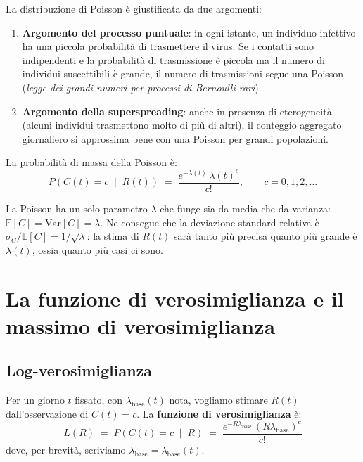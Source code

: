 \documentclass[12pt,a4paper]{article}
\newcommand{\lbase}{\lambda_{\mathrm{base}}}
\begin{document}
La distribuzione di Poisson è giustificata da due argomenti:

\begin{enumerate}
  \item \textbf{Argomento del processo puntuale}: in ogni istante, un individuo infettivo
        ha una piccola probabilità di trasmettere il virus. Se i contatti sono indipendenti
        e la probabilità di trasmissione è piccola ma il numero di individui suscettibili
        è grande, il numero di trasmissioni segue una Poisson (\emph{legge dei grandi numeri
        per processi di Bernoulli rari}).

  \item \textbf{Argomento della superspreading}: anche in presenza di eterogeneità
        (alcuni individui trasmettono molto di più di altri), il conteggio aggregato
        giornaliero si approssima bene con una Poisson per grandi popolazioni.
\end{enumerate}

La probabilità di massa della Poisson è:
\begin{equation}
  P\!\left(C(t) = c \;\middle|\; R(t)\right) \;=\; \frac{e^{-\lambda(t)}\, \lambda(t)^c}{c!}, \qquad c = 0, 1, 2, \ldots
\end{equation}

\begin{osservazione}
La Poisson ha un solo parametro $\lambda$ che funge sia da media che da varianza:
$\mathbb{E}[C] = \mathrm{Var}[C] = \lambda$. Ne consegue che la deviazione standard
relativa è $\sigma_C / \mathbb{E}[C] = 1/\sqrt{\lambda}$: la stima di $R(t)$ sarà
tanto più precisa quanto più grande è $\lambda(t)$, ossia quanto più casi ci sono.
\end{osservazione}

\section{La funzione di verosimiglianza e il massimo di verosimiglianza}
\label{sec:lik}

\subsection{Log-verosimiglianza}

Per un giorno $t$ fissato, con $\lbase(t)$ nota, vogliamo stimare $R(t)$ dall'osservazione
di $C(t) = c$. La \textbf{funzione di verosimiglianza} è:
\begin{equation}
  L(R) \;=\; P\!\left(C(t) = c \;\middle|\; R\right) \;=\; \frac{e^{-R\lbase}\,(R\lbase)^c}{c!}
\end{equation}
dove, per brevità, scriviamo $\lbase = \lbase(t)$.
\end{document}
